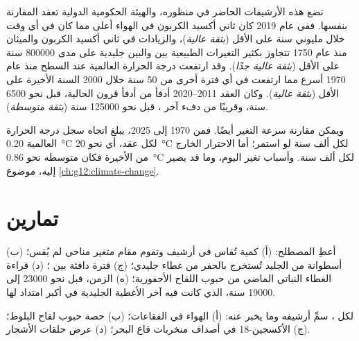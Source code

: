 تضع هذه الأرشيفات الحاضر في منظوره، والهيئة الحكومية الدولية تعقد المقارنة
بنفسها. ففي عام 2019 كان ثاني أكسيد الكربون في الهواء أعلى مما كان في أي وقت خلال
مليوني سنة على الأقل (\emph{بثقة عالية})، والزيادات في ثاني أكسيد
الكربون والميثان منذ عام 1750 تتجاوز بكثير التغيرات الطبيعية بين 
والبين جليدية على مدى \num{800000} سنة على الأقل (\emph{بثقة عالية
جدًا}). وقد ارتفعت درجة الحرارة العالمية عند السطح منذ عام 1970 أسرع مما ارتفعت
في أي فترة أخرى من 50 سنة خلال \num{2000} السنة الأخيرة على الأقل
(\emph{بثقة عالية}). وكان العقد 2011--2020 أدفأ من أدفأ
قرون  الحالية، قبل نحو \num{6500} سنة، وقريبًا
من دفء آخر ، قبل نحو \num{125000} سنة
(\emph{بثقة متوسطة}).

ويمكن مقارنة سرعة التغير أيضًا. فمن 1970 إلى 2025، يبلغ اتجاه
سجل درجة الحرارة العالمية \qty{0.20}{\degreeCelsius} لكل عقد، أي
نحو \qty{20}{\degreeCelsius} لكل ألف سنة لو استمر؛ أما
الاحترار الخارج من  الأخيرة فكان متوسطه نحو
\qty{0.86}{\degreeCelsius} لكل ألف سنة. وأسباب تغير اليوم،
وما قد يصير إليه، موضوع \cref{ch:g12:climate-change}.

\section{تمارين}

\begin{exercise}[$\star$]\label{exo:g12:past-climates:1}
أعطِ المصطلح: (أ) كمية تُقاس في أرشيف وتقوم مقام
متغير مناخي لم يُقس؛ (ب) أسطوانة من الجليد تُستخرج بالحفر من غطاء جليدي؛
(ج) فترة دافئة بين ؛ (د) قراءة الغطاء النباتي الماضي
من حبوب اللقاح الأحفورية؛ (ه) الزمن، قبل نحو \num{23000} إلى \num{19000}
سنة، الذي كانت فيه آخر الأغطية الجليدية في أكبر امتداد لها.
\end{exercise}

\begin{exercise}[$\star$]\label{exo:g12:past-climates:2}
لكل ، سمِّ أرشيفه وما يخبر عنه: (أ) الهواء في
الفقاعات؛ (ب) حصة حبوب لقاح البلوط؛ (ج) الأكسجين-18 في أصداف
منخربات قاع البحر؛ (د) عرض حلقات الأشجار.
\end{exercise}

